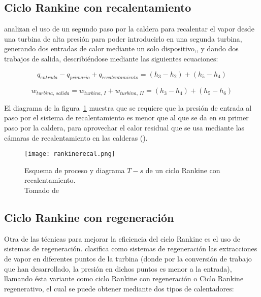 \subsection{Ciclo Rankine con recalentamiento}

\textcite{ccengel2006termodinamica} analizan el uso de un segundo paso por la caldera para recalentar el vapor desde una turbina de alta presión para poder introducirlo en una segunda turbina, generando dos entradas de calor mediante un solo dispositivo,, y dando dos trabajos de salida, describiéndose mediante las siguientes ecuaciones:

\begin{equation}
  q_{entrada}-q_{primario}+q_{recalentamiento}=(h_3-h_2)+(h_5-h_4)
  \label{eq:qrecal}
\end{equation}

\begin{equation}
  w_{turbina,\,salida}=w_{turbina,\,I}+w_{turbina,\,II}=(h_3-h_4)+(h_5-h_6)
  \label{eq:wrecal}
\end{equation}

El diagrama de la figura~\ref{fig:ciclorecalrankine} muestra que se requiere que la presión de entrada al paso por el sistema de recalentamiento es menor que al que se da en su primer paso por la caldera, para aprovechar el calor residual que se usa mediante las cámaras de recalentamiento en las calderas (\cite{burghardt1984ingenieria}).

\begin{figure}[H]
  \begin{center}
    \texttt{[image: rankinerecal.png]}
  \end{center}
  \caption{Esquema de proceso y diagrama $T-s$ de un ciclo Rankine con recalentamiento. \\Tomado de \textcite{ccengel2006termodinamica}}
  \label{fig:ciclorecalrankine}
\end{figure}

\subsection{Ciclo Rankine con regeneración}

Otra de las técnicas para mejorar la eficiencia del ciclo Rankine es el uso de sistemas de regeneración. \textcite{rajput2009engineering} clasifica como sistemas de regeneración las extracciones de vapor en diferentes puntos de la turbina (donde por la conversión de trabajo que han desarrollado, la presión en dichos puntos es menor a la entrada), llamando ésta variante como ciclo Rankine con regeneración o Ciclo Rankine regenerativo, el cual se puede obtener mediante dos tipos de calentadores:

